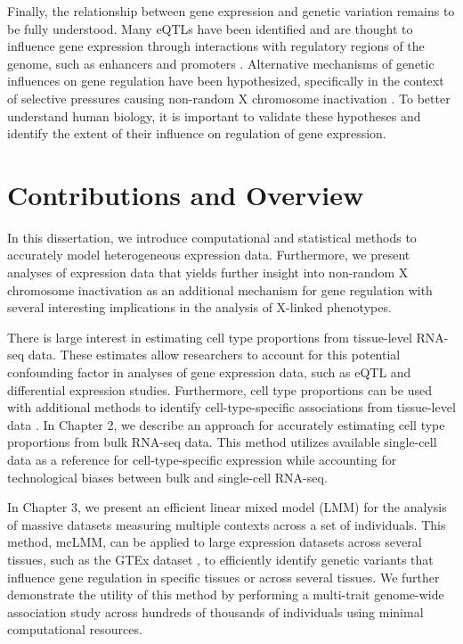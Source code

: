 Finally, the relationship between gene expression and genetic variation remains to be fully understood. Many eQTLs have been identified and are thought to influence gene expression through interactions with regulatory regions of the genome, such as enhancers and promoters \cite{Garieri2017}. Alternative mechanisms of genetic influences on gene regulation have been hypothesized, specifically in the context of selective pressures causing non-random X chromosome inactivation \cite{Migeon1998-gc}. To better understand human biology, it is important to validate these hypotheses and identify the extent of their influence on regulation of gene expression. 

\section{Contributions and Overview}
In this dissertation, we introduce computational and statistical methods to accurately model heterogeneous expression data. Furthermore, we present analyses of expression data that yields further insight into non-random X chromosome inactivation as an additional mechanism for gene regulation with several interesting implications in the analysis of X-linked phenotypes.

There is large interest in estimating cell type proportions from tissue-level RNA-seq data. These estimates allow researchers to account for this potential confounding factor in analyses of gene expression data, such as eQTL and differential expression studies. Furthermore, cell type proportions can be used with additional methods to identify cell-type-specific associations from tissue-level data \cite{Shen-Orr2010-tg}. In Chapter 2, we describe an approach for accurately estimating cell type proportions from bulk RNA-seq data. This method utilizes available single-cell data as a reference for cell-type-specific expression while accounting for technological biases between bulk and single-cell RNA-seq.

In Chapter 3, we present an efficient linear mixed model (LMM) for the analysis of massive datasets measuring multiple contexts across a set of individuals. This method, mcLMM, can be applied to large expression datasets across several tissues, such as the GTEx dataset \cite{GTEx_Consortium2020-xx}, to efficiently identify genetic variants that influence gene regulation in specific tissues or across several tissues. We further demonstrate the utility of this method by performing a multi-trait genome-wide association study across hundreds of thousands of individuals using minimal computational resources.

